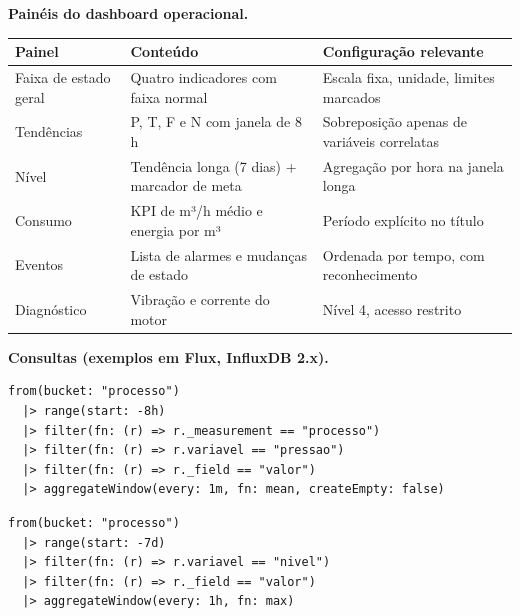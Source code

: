 \textbf{Painéis do dashboard operacional.}

\begin{longtable}[]{@{}
  >{\raggedright\arraybackslash}p{}
  >{\raggedright\arraybackslash}p{}
  >{\raggedright\arraybackslash}p{}@{}}
\toprule\noalign{}
\begin{minipage}[b]{\linewidth}\raggedright
Painel
\end{minipage} & \begin{minipage}[b]{\linewidth}\raggedright
Conteúdo
\end{minipage} & \begin{minipage}[b]{\linewidth}\raggedright
Configuração relevante
\end{minipage} \\
\midrule\noalign{}
\endhead
\bottomrule\noalign{}
\endlastfoot
Faixa de estado geral & Quatro indicadores com faixa normal & Escala fixa, unidade, limites marcados \\
Tendências & P, T, F e N com janela de 8 h & Sobreposição apenas de variáveis correlatas \\
Nível & Tendência longa (7 dias) + marcador de meta & Agregação por hora na janela longa \\
Consumo & KPI de m³/h médio e energia por m³ & Período explícito no título \\
Eventos & Lista de alarmes e mudanças de estado & Ordenada por tempo, com reconhecimento \\
Diagnóstico & Vibração e corrente do motor & Nível 4, acesso restrito \\
\end{longtable}

\textbf{Consultas (exemplos em Flux, InfluxDB 2.x).}

\begin{lstlisting}
from(bucket: "processo")
  |> range(start: -8h)
  |> filter(fn: (r) => r._measurement == "processo")
  |> filter(fn: (r) => r.variavel == "pressao")
  |> filter(fn: (r) => r._field == "valor")
  |> aggregateWindow(every: 1m, fn: mean, createEmpty: false)
\end{lstlisting}

\begin{lstlisting}
from(bucket: "processo")
  |> range(start: -7d)
  |> filter(fn: (r) => r.variavel == "nivel")
  |> filter(fn: (r) => r._field == "valor")
  |> aggregateWindow(every: 1h, fn: max)
\end{lstlisting}

